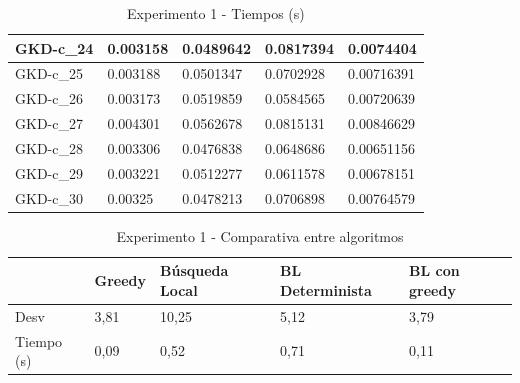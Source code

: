 \documentclass[11pt,a4paper]{article}
\begin{document}
\begin{table}[H]
\begin{tabular}{l|l|l|l|l|}
			\multicolumn{1}{|l|}{GKD-c\_24} & 0.003158                    & 0.0489642                           & 0.0817394                            & 0.0074404                      \\ \hline
			\multicolumn{1}{|l|}{GKD-c\_25} & 0.003188                    & 0.0501347                           & 0.0702928                            & 0.00716391                     \\ \hline
			\multicolumn{1}{|l|}{GKD-c\_26} & 0.003173                    & 0.0519859                           & 0.0584565                            & 0.00720639                     \\ \hline
			\multicolumn{1}{|l|}{GKD-c\_27} & 0.004301                    & 0.0562678                           & 0.0815131                            & 0.00846629                     \\ \hline
			\multicolumn{1}{|l|}{GKD-c\_28} & 0.003306                    & 0.0476838                           & 0.0648686                            & 0.00651156                     \\ \hline
			\multicolumn{1}{|l|}{GKD-c\_29} & 0.003221                    & 0.0512277                           & 0.0611578                            & 0.00678151                     \\ \hline
			\multicolumn{1}{|l|}{GKD-c\_30} & 0.00325                     & 0.0478213                           & 0.0706898                            & 0.00764579                     \\ \hline
		\end{tabular}
		\caption{ Experimento 1 - Tiempos (s) }
		\label{tiempos}
	\end{table}

	\begin{table}[H]
		\begin{tabular}{l|l|l|l|l|}
			\cline{2-5}
			& Greedy & Búsqueda Local & BL Determinista & BL con greedy \\ \hline
			\multicolumn{1}{|l|}{Desv}       & 3,81   & 10,25          & 5,12            & 3,79          \\ \hline
			\multicolumn{1}{|l|}{Tiempo (s)} & 0,09   & 0,52           & 0,71            & 0,11          \\ \hline
		\end{tabular}
	
		\caption{ Experimento 1 - Comparativa entre algoritmos }
		\label{comparativa}
	\end{table}
\end{document}
